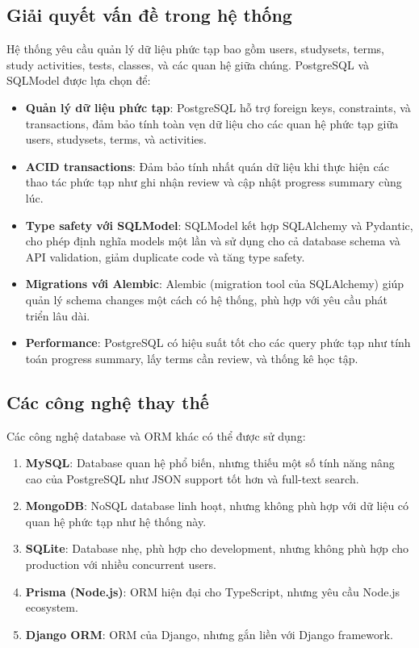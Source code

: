 \documentclass[../DoAn.tex]{subfiles}
\begin{document}
\subsection{Giải quyết vấn đề trong hệ thống}

Hệ thống yêu cầu quản lý dữ liệu phức tạp bao gồm users, studysets, terms, study activities, tests, classes, và các quan hệ giữa chúng. PostgreSQL và SQLModel được lựa chọn để:

\begin{itemize}
    \item \textbf{Quản lý dữ liệu phức tạp}: PostgreSQL hỗ trợ foreign keys, constraints, và transactions, đảm bảo tính toàn vẹn dữ liệu cho các quan hệ phức tạp giữa users, studysets, terms, và activities.
    
    \item \textbf{ACID transactions}: Đảm bảo tính nhất quán dữ liệu khi thực hiện các thao tác phức tạp như ghi nhận review và cập nhật progress summary cùng lúc.
    
    \item \textbf{Type safety với SQLModel}: SQLModel kết hợp SQLAlchemy và Pydantic, cho phép định nghĩa models một lần và sử dụng cho cả database schema và API validation, giảm duplicate code và tăng type safety.
    
    \item \textbf{Migrations với Alembic}: Alembic (migration tool của SQLAlchemy) giúp quản lý schema changes một cách có hệ thống, phù hợp với yêu cầu phát triển lâu dài.
    
    \item \textbf{Performance}: PostgreSQL có hiệu suất tốt cho các query phức tạp như tính toán progress summary, lấy terms cần review, và thống kê học tập.
\end{itemize}

\subsection{Các công nghệ thay thế}

Các công nghệ database và ORM khác có thể được sử dụng:

\begin{enumerate}
    \item \textbf{MySQL}: Database quan hệ phổ biến, nhưng thiếu một số tính năng nâng cao của PostgreSQL như JSON support tốt hơn và full-text search.
    
    \item \textbf{MongoDB}: NoSQL database linh hoạt, nhưng không phù hợp với dữ liệu có quan hệ phức tạp như hệ thống này.
    
    \item \textbf{SQLite}: Database nhẹ, phù hợp cho development, nhưng không phù hợp cho production với nhiều concurrent users.
    
    \item \textbf{Prisma (Node.js)}: ORM hiện đại cho TypeScript, nhưng yêu cầu Node.js ecosystem.
    
    \item \textbf{Django ORM}: ORM của Django, nhưng gắn liền với Django framework.
\end{enumerate}
\end{document}
